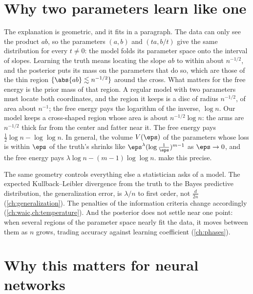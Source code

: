 \begin{refsection}
\section*{Why two parameters learn like one}

The explanation is geometric, and it fits in a paragraph. The data can only see the product $ab$, so the parameters $(a,b)$ and $(ta,b/t)$ give the same distribution for every $t\neq0$: the model folds its parameter space onto the interval of slopes. Learning the truth means locating the slope $ab$ to within about $n^{-1/2}$, and the posterior puts its mass on the parameters that do so, which are those of the thin region $\{\abs{ab}\lesssim n^{-1/2}\}$ around the cross. What matters for the free energy is the prior mass of that region. A regular model with two parameters must locate both coordinates, and the region it keeps is a disc of radius $n^{-1/2}$, of area about $n^{-1}$; the free energy pays the logarithm of the inverse, $\log n$. Our model keeps a cross-shaped region whose area is about $n^{-1/2}\log n$: the arms are $n^{-1/2}$ thick far from the center and fatter near it. The free energy pays $\tfrac12\log n-\log\log n$. In general, the volume $V(\eps)$ of the parameters whose loss is within $\eps$ of the truth's shrinks like $\eps^\lambda(\log\frac1\eps)^{m-1}$ as $\eps\to0$, and the free energy pays $\lambda\log n-(m-1)\log\log n$.  make this precise.

The same geometry controls everything else a statistician asks of a model. The expected Kullback--Leibler divergence from the truth to the Bayes predictive distribution, the generalization error, is $\lambda/n$ to first order, not $\tfrac d{2n}$ (\cref{ch:generalization}). The penalties of the information criteria change accordingly (\cref{ch:waic,ch:temperature}). And the posterior does not settle near one point: when several regions of the parameter space nearly fit the data, it moves between them as $n$ grows, trading accuracy against learning coefficient (\cref{ch:phases}).

\section*{Why this matters for neural networks}


\end{refsection}
